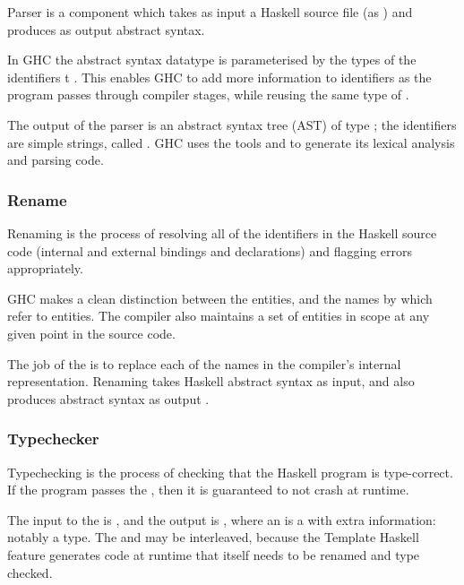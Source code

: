 \begin{explication}
Parser is a component which takes as input a Haskell source file (as ) and produces as output abstract syntax. \cite{wilson2011architecture}
\end{explication}

In GHC the abstract syntax datatype  is parameterised by the types of the identifiers t . This enables GHC to add more information to identifiers as the program passes through compiler stages, while reusing the same type of .

The output of the parser is an abstract syntax tree (AST) of type ; the identifiers are simple strings, called . GHC uses the tools  and  to generate its lexical analysis and parsing code.

\subsubsection{Rename}
\begin{explication}
Renaming is the process of resolving all of the identifiers in the Haskell source code (internal and external bindings and declarations) and flagging errors appropriately. \cite{wilson2011architecture}
\end{explication}

GHC makes a clean distinction between the entities, and the names by which refer to entities. The compiler also maintains a set of entities in scope at any given point in the source code.

The job of the  is to replace each of the names in the compiler's internal representation. Renaming takes Haskell abstract syntax  as input, and also produces abstract syntax as output . 

\subsubsection{Typechecker}
\begin{explication}
Typechecking is the process of checking that the Haskell program is type-correct. If the program passes the , then it is guaranteed to not crash at runtime. \cite{wilson2011architecture}
\end{explication}

The input to the  is , and the output is , where an  is a  with extra information: notably a type. The  and  may be interleaved, because the Template Haskell feature generates code at runtime that itself needs to be renamed and type checked.

